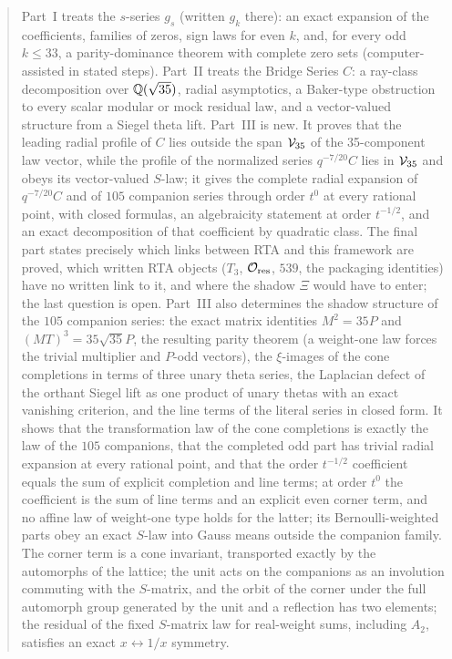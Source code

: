 \begin{abstract}
Part~I treats the $s$-series $g_s$ (written $g_k$ there): an exact expansion of the coefficients, families of zeros, sign laws for even $k$,
and, for every odd $k\le33$, a parity-dominance theorem with complete zero sets (computer-assisted in stated steps). Part~II treats the Bridge
Series $C$: a ray-class decomposition over $\Q(\sqrt{35})$, radial asymptotics, a Baker-type obstruction to every scalar modular or mock residual law,
and a vector-valued structure from a Siegel theta lift. Part~III is new. It proves that the leading radial profile of $C$ lies outside the span
$\VV$ of the 35-component law vector, while the profile of the normalized series $q^{-7/20}C$ lies in $\VV$ and obeys its vector-valued
$S$-law; it gives the complete radial expansion of $q^{-7/20}C$ and of $105$ companion series through order $t^0$ at every rational point,
with closed formulas, an algebraicity statement at order $t^{-1/2}$, and an exact decomposition of that coefficient by quadratic class.
The final part states precisely which links between RTA and this framework are proved, which written RTA objects ($T_3$, $\mathcal O_{\rm res}$,
$539$, the packaging identities) have no written link to it, and where the shadow $\Xi$ would have to enter; the last question is open.
Part~III also determines the shadow structure of the $105$ companion series: the exact matrix identities $M^2=35P$ and $(MT)^3=35\sqrt{35}P$, the resulting parity
theorem (a weight-one law forces the trivial multiplier and $P$-odd vectors), the $\xi$-images of the cone completions in terms of three unary theta series, the Laplacian
defect of the orthant Siegel lift as one product of unary thetas with an exact vanishing criterion, and the line terms of the literal series in closed form. It shows that the transformation law of the cone completions is exactly the law of the $105$ companions, that the completed odd part has trivial radial expansion at every rational point, and that the order $t^{-1/2}$ coefficient equals the sum of explicit completion and line terms; at order $t^0$ the coefficient is the sum of line terms and an explicit even corner term, and no affine law of weight-one type holds for the latter; its Bernoulli-weighted parts obey an exact $S$-law into Gauss means outside the companion family. The corner term is a cone invariant, transported exactly by the automorphs of the lattice; the unit acts on the companions as an involution commuting with the $S$-matrix, and the orbit of the corner under the full automorph group generated by the unit and a reflection has two elements; the residual of the fixed $S$-matrix law for real-weight sums, including $A_2$, satisfies an exact $x\leftrightarrow1/x$ symmetry.

\end{abstract}
